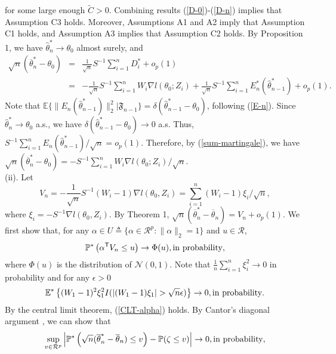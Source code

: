 \documentclass[12pt]{article}
\def\trans{^{\rm \textsf{T}}}
\def\wh{\widehat}
\def\ol{\overline}
\begin{document}
for some large enough $\widetilde{C}>0$. Combining results (\ref{D-0})-(\ref{D-n}) implies that Assumption C3 holds. Moreover, Assumptions A1 and A2 imply that Assumption C1 holds, and Assumption A3 implies that Assumption C2 holds. By Proposition 1, we have $\wh{\theta}^*_n\rightarrow\theta_0$ almost surely, and
\begin{eqnarray}\label{sum-martingale}
\sqrt{n}(\ol{\theta}_n^*-\theta_0)&=&\frac{1}{\sqrt{n}}S^{-1}\sum_{i=1}^n D_i^*+ o_p(1)\nonumber\\
&=& -\frac{1}{\sqrt{n}}S^{-1}\sum_{i=1}^n W_i \nabla l(\theta_0; Z_i)+\frac{1}{\sqrt{n}}S^{-1}\sum_{i=1}^n E^*_n(\wh{\theta}^*_{n-1})+o_p(1).
\end{eqnarray}
Note that $\mathbb{E}\{\|E_n(\wh{\theta}^*_{n-1})\|_2^2|\mathfrak{F}_{n-1}\}=\delta(\wh{\theta}^*_{n-1}-\theta_0)$, following (\ref{E-n}). Since $\wh{\theta}^*_n\rightarrow\theta_0$ a.s., we have $\delta(\wh{\theta}^*_{n-1}-\theta_0)\rightarrow 0$ a.s. Thus, $S^{-1}\sum_{i=1}^n E_n(\wh{\theta}^*_{n-1})/\sqrt{n}=o_p(1)$. Therefore, by (\ref{sum-martingale}), we have $\sqrt{n}(\ol{\theta}_n^*-\theta_0)= -S^{-1}\sum_{i=1}^n W_i \nabla l(\theta_0; Z_i)/\sqrt{n}$.\\
(ii). Let
\begin{equation}\label{V-n}
V_n=-\frac{1}{\sqrt{n}}S^{-1}(W_i-1)\nabla l(\theta_0, Z_i)=\sum_{i=1}^n (W_i-1)\xi_i/\sqrt{n},
\end{equation}
where $\xi_i=-S^{-1}\nabla l(\theta_0, Z_i)$. By Theorem 1, $\sqrt{n}(\ol{\theta}^*_n-\ol{\theta}_n)=V_n+o_p(1)$. We first show that, for any $\alpha\in U\triangleq\{\alpha\in\mathcal{R}^p: \|\alpha\|_2=1\}$ and  $u\in\mathcal{R}$,
\begin{equation}\label{CLT-alpha}
\mathbb{P}^*\left(\alpha\trans V_n\leq u\right)\rightarrow\Phi(u), {\rm in\ probability},
\end{equation}
where $\Phi(u)$ is the distribution of $\mathcal{N}(0, 1)$. Note that $\frac{1}{n}\sum_{i=1}^n\xi^2_i\rightarrow 0$ in probability and for any $\epsilon>0$
\begin{equation}\label{Lind-cond}
\mathbb{E}^*\left\{(W_1-1)^2\xi_1^2I(|(W_1-1)\xi_1|>\sqrt{n}\epsilon)\right\}\rightarrow 0, {\rm in\ probability.}
\end{equation}
By the central limit theorem, (\ref{CLT-alpha}) holds. By Cantor's diagonal argument \cite{rao1992approximation}, we can show that 
\begin{equation}\label{eq-co-1}
\sup_{v\in\mathcal{R}^p}\left|\mathbb{P}^*\left(\sqrt{n}(\ol{\theta}^*_n-\ol{\theta}_n)\leq v\right)-\mathbb{P}(\zeta\leq v)\right| \rightarrow 0, {\rm in\ probability, }
\end{equation}
\end{document}
